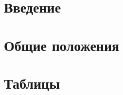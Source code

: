 \documentclass[11pt,oneside]{book}
\begin{document}
\newpage
\chapter{Введение}
\newpage
\newpage
\newpage
\chapter{Общие положения}
\newpage
\newpage
\newpage
\chapter{Таблицы}
\newpage
\newpage
\tableofcontents
\end{document}
